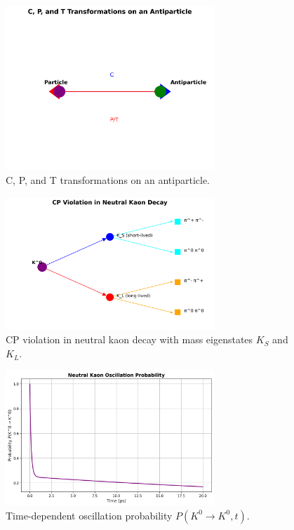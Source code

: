 \documentclass[12pt,a4paper]{article}
\begin{document}
\begin{figure}[H]
\centering
\includegraphics[width=0.7\textwidth]{CPT_diagram.png}
\caption{C, P, and T transformations on an antiparticle.}
\label{fig:CPT}
\end{figure}

\begin{figure}[H]
\centering
\includegraphics[width=0.7\textwidth]{kaon_decay.png}
\caption{CP violation in neutral kaon decay with mass eigenstates $K_S$ and $K_L$.}
\label{fig:kaon}
\end{figure}

\begin{figure}[H]
\centering
\includegraphics[width=0.7\textwidth]{K0_oscillation.png}
\caption{Time-dependent oscillation probability $P(K^0 \to K^0,t)$.}
\label{fig:K0osc}
\end{figure}
\end{document}
